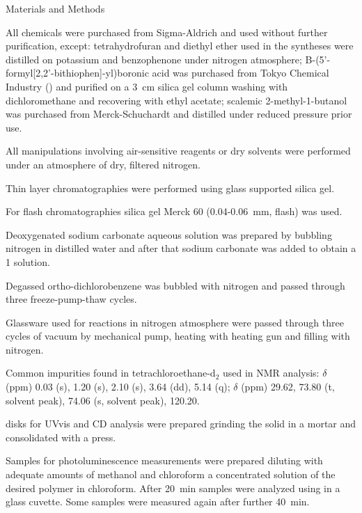 \begin{section}{Materials and Methods}

All chemicals were purchased from Sigma-Aldrich and used without further purification, except: tetrahydrofuran and diethyl ether used in the syntheses were distilled on potassium and benzophenone under nitrogen atmosphere; B-(5'-formyl[2,2'-bi\-thio\-phen]-yl)\-boronic acid was purchased from Tokyo Chemical Industry () and purified on a \SI{3}{\cm} silica gel column washing with dichloromethane and recovering with ethyl acetate; scalemic 2-methyl-1-butanol was purchased from Merck-Schuchardt and distilled under reduced pressure prior use.

All manipulations involving air-sensitive reagents or dry solvents were performed under an atmosphere of dry, filtered nitrogen. 

Thin layer chromatographies were performed using glass supported silica gel.

For flash chromatographies silica gel Merck 60 (0.04-\SI{0.06}{\mm}, flash) was used.

De\-oxy\-gen\-ated sodium carbonate aqueous solution was prepared by bubbling nitrogen in distilled water and after that sodium carbonate was added to obtain a \SI{1}{\Molar} solution.

Degassed ortho-di\-chloro\-benzene was bubbled with nitrogen and passed through three freeze-pump-thaw cycles.

Glassware used for reactions in nitrogen atmosphere were passed through three cycles of vacuum by mechanical pump, heating with heating gun and filling with nitrogen.

Common impurities found in tetra\-chloro\-ethane-d$_2$ used in \gls{NMR} analysis: {\HNMR} $\delta$ (ppm) 0.03 (s), 1.20 (s), 2.10 (s), 3.64 (dd), 5.14 (q); {\CNMR} $\delta$ (ppm) 29.62, 73.80 (t, solvent peak), 74.06 (s, solvent peak), 120.20. 

 disks for \gls{UVvis} and \gls{CD} analysis were prepared grinding the solid in a mortar and consolidated with a press. 

Samples for photoluminescence measurements were prepared diluting with adequate amounts of methanol and chloroform a concentrated solution of the desired polymer in chloroform. After \SI{20}{\minute} samples were analyzed using in a glass cuvette. Some samples were measured again after further \SI{40}{\minute}.

\end{section}
